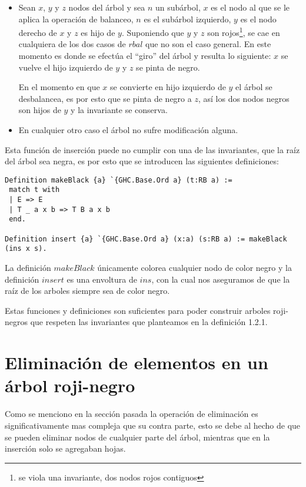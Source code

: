 \documentclass[letterpaper,12pt,oneside]{book}
\newcommand{\arn}{árbol roji-negro}
\newcommand{\arns}{arboles roji-negros}
\theoremstyle{plain}
\theoremstyle{definition}
\theoremstyle{remark}
\begin{document}
\begin{itemize}
    \item Sean $x$, $y$ y $z$ nodos del \'arbol y sea $n$ un subárbol, $x$ es el nodo al que se le aplica
    la operaci\'on de balanceo, $n$ es el subárbol izquierdo, $y$ es el nodo derecho  de $x$ y $z$ es 
    hijo de $y$. Suponiendo que $y$ y $z$ son rojos\footnote{se viola una invariante, dos nodos rojos 
    contiguos}, se cae en cualquiera de los dos casos de $rbal$ que no son el caso general. En este 
    momento es donde se efectúa el ``giro'' del árbol y resulta lo siguiente: $x$ se vuelve el hijo 
    izquierdo de $y$ y $z$ se pinta de negro.
    
    En el momento en que $x$ se convierte en hijo izquierdo de $y$ el \'arbol se desbalancea, es por esto
    que se pinta de negro a $z$, así los dos nodos negros son hijos de $y$ y la invariante se conserva.
    \item En cualquier otro caso el \'arbol no sufre modificaci\'on alguna.
\end{itemize}{}

Esta función de inserción puede no cumplir con una de las invariantes, que la raíz del árbol sea negra, 
es por esto que se introducen las siguientes definiciones:

\begin{verbatim}
Definition makeBlack {a} `{GHC.Base.Ord a} (t:RB a) :=
 match t with
 | E => E
 | T _ a x b => T B a x b
 end.

Definition insert {a} `{GHC.Base.Ord a} (x:a) (s:RB a) := makeBlack (ins x s).
\end{verbatim}

La definici\'on $makeBlack$ únicamente colorea cualquier nodo de color negro y la definición $insert$ es 
una envoltura de $ins$, con la cual nos aseguramos de que la ra\'iz de los arboles siempre sea de color 
negro.

Estas funciones y definiciones son suficientes para poder construir {\arns} que respeten las invariantes 
que planteamos en la definici\'on 1.2.1. 

\section{Eliminación de elementos en un {\arn}}

Como se menciono en la secci\'on pasada la operaci\'on de eliminaci\'on es significativamente mas 
compleja que su contra parte, esto se debe al hecho de que se pueden eliminar nodos de cualquier parte 
del \'arbol, mientras que en la inserci\'on solo se agregaban hojas.
\end{document}
